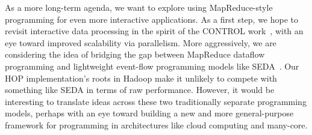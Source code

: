 As a more long-term agenda, we want to explore using MapReduce-style programming for even more interactive applications.  As a first step, we hope to revisit interactive data processing in the spirit of the CONTROL work~\cite{ieeecontrol}, with an eye toward improved scalability via parallelism.  More aggressively, we are considering the idea of bridging the gap between MapReduce dataflow programming and lightweight event-flow programming models like SEDA~\cite{seda}.  Our HOP implementation's roots in Hadoop make it unlikely to compete with something like SEDA in terms of raw performance. However, it would be interesting to translate ideas across these two traditionally separate programming models, perhaps with an eye toward building a new and more general-purpose framework for programming in architectures like cloud computing and many-core.


